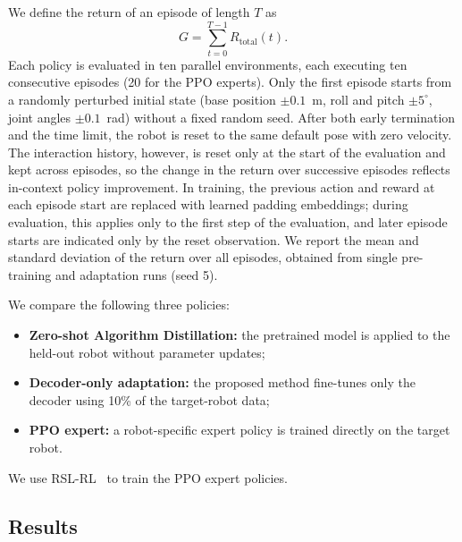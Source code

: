 \documentclass[runningheads]{llncs}
\begin{document}
We define the return of an episode of length $T$ as
\begin{equation}
G=\sum_{t=0}^{T-1}R_{\mathrm{total}}(t).
\label{eq:episode_return}
\end{equation}
Each policy is evaluated in ten parallel environments, each executing ten consecutive episodes (20 for the PPO experts).
Only the first episode starts from a randomly perturbed initial state (base position $\pm0.1$~m, roll and pitch $\pm5^\circ$, joint angles $\pm0.1$~rad) without a fixed random seed.
After both early termination and the time limit, the robot is reset to the same default pose with zero velocity.
The interaction history, however, is reset only at the start of the evaluation and kept across episodes, so the change in the return over successive episodes reflects in-context policy improvement.
In training, the previous action and reward at each episode start are replaced with learned padding embeddings; during evaluation, this applies only to the first step of the evaluation, and later episode starts are indicated only by the reset observation.
We report the mean and standard deviation of the return over all episodes, obtained from single pre-training and adaptation runs (seed 5).

We compare the following three policies:
\begin{itemize}
  \item \textbf{Zero-shot Algorithm Distillation:}
  the pretrained model is applied to the held-out robot without parameter updates;
  \item \textbf{Decoder-only adaptation:}
  the proposed method fine-tunes only the decoder using 10\% of the target-robot data;
  \item \textbf{PPO expert:}
  a robot-specific expert policy is trained directly on the target robot.
\end{itemize}
We use RSL-RL~\cite{schwarke2025rslrllearninglibraryrobotics} to train the PPO expert policies.



\FloatBarrier  %


\subsection{Results}
\end{document}
